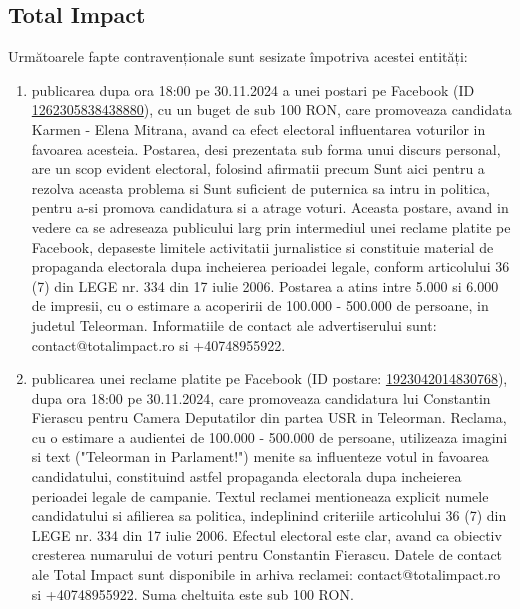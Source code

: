 \documentclass[a4paper,12pt]{article}
\begin{document}
\vspace{0.5cm}

\subsection{Total Impact}
Următoarele fapte contravenționale sunt sesizate împotriva acestei entități:

\begin{enumerate}[leftmargin=*, label=\arabic*.)]
    \item publicarea dupa ora 18:00 pe 30.11.2024 a unei postari pe Facebook (ID \href{https://www.facebook.com/ads/library/?id=1262305838438880}{1262305838438880}), cu un buget de sub 100 RON, care promoveaza candidata Karmen - Elena Mitrana,  avand ca efect electoral influentarea voturilor in favoarea acesteia. Postarea, desi prezentata sub forma unui discurs personal, are un scop evident electoral, folosind afirmatii precum Sunt aici pentru a rezolva aceasta problema si Sunt suficient de puternica sa intru in politica,  pentru a-si promova candidatura si a atrage voturi.  Aceasta postare, avand in vedere ca se adreseaza publicului larg prin intermediul unei reclame platite pe Facebook, depaseste limitele activitatii jurnalistice si constituie material de propaganda electorala dupa incheierea perioadei legale, conform articolului 36 (7) din LEGE nr. 334 din 17 iulie 2006.  Postarea a atins intre 5.000 si 6.000 de impresii, cu o estimare a acoperirii de 100.000 - 500.000 de persoane, in judetul Teleorman. Informatiile de contact ale advertiserului sunt: contact@totalimpact.ro si +40748955922.
    \item publicarea unei reclame platite pe Facebook (ID postare: \href{https://www.facebook.com/ads/library/?id=1923042014830768}{1923042014830768}), dupa ora 18:00 pe 30.11.2024, care promoveaza candidatura lui Constantin Fierascu pentru Camera Deputatilor din partea USR in Teleorman. Reclama, cu o estimare a audientei de 100.000 - 500.000 de persoane, utilizeaza imagini si text ("Teleorman in Parlament!") menite sa influenteze votul in favoarea candidatului, constituind astfel propaganda electorala dupa incheierea perioadei legale de campanie.  Textul reclamei mentioneaza explicit numele candidatului si afilierea sa politica, indeplinind criteriile articolului 36 (7) din LEGE nr. 334 din 17 iulie 2006.  Efectul electoral este clar, avand ca obiectiv cresterea numarului de voturi pentru Constantin Fierascu.  Datele de contact ale Total Impact sunt disponibile in arhiva reclamei: contact@totalimpact.ro si +40748955922. Suma cheltuita este sub 100 RON.

\end{enumerate}
\end{document}

